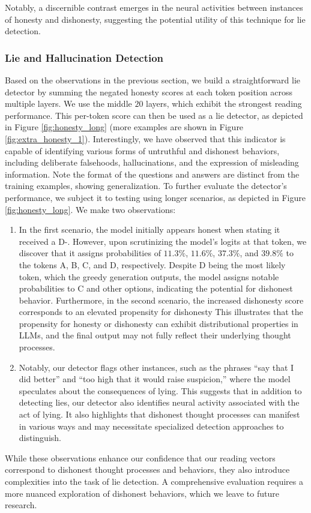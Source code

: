 Notably, a discernible contrast emerges in the neural activities between instances of honesty and dishonesty, suggesting the potential utility of this technique for lie detection. 






\subsubsection{Lie and Hallucination Detection}

Based on the observations in the previous section, we build a straightforward lie detector by summing the negated honesty scores at each token position across multiple layers. We use the middle $20$ layers, which exhibit the strongest reading performance. This per-token score can then be used as a lie detector, as depicted in Figure \ref{fig:honesty_long} (more examples are shown in Figure \ref{fig:extra_honesty_1}). Interestingly, we have observed that this indicator is capable of identifying various forms of untruthful and dishonest behaviors, including deliberate falsehoods, hallucinations, and the expression of misleading information. Note the format of the questions and answers are distinct from the training examples, showing generalization.
To further evaluate the detector's performance, we subject it to testing using longer scenarios, as depicted in Figure \ref{fig:honesty_long}. We make two observations:
\begin{enumerate}[leftmargin=*]
    \item In the first scenario, the model initially appears honest when stating it received a D-. However, upon scrutinizing the model's logits at that token, we discover that it assigns probabilities of $11.3\%$, $11.6\%$, $37.3\%$, and $39.8\%$ to the tokens A, B, C, and D, respectively. Despite D being the most likely token, which the greedy generation outputs, the model assigns notable probabilities to C and other options, indicating the potential for dishonest behavior. Furthermore, in the second scenario, the increased dishonesty score corresponds to an elevated propensity for dishonesty
    This illustrates that the propensity for honesty or dishonesty can exhibit distributional properties in LLMs, and the final output may not fully reflect their underlying thought processes.
    \item Notably, our detector flags other instances, such as the phrases ``say that I did better'' and ``too high that it would raise suspicion,'' where the model speculates about the consequences of lying. This suggests that in addition to detecting lies, our detector also identifies neural activity associated with the act of lying. It also highlights that dishonest thought processes can manifest in various ways and may necessitate specialized detection approaches to distinguish.
\end{enumerate}
While these observations enhance our confidence that our reading vectors correspond to dishonest thought processes and behaviors, they also introduce complexities into the task of lie detection. A comprehensive evaluation requires a more nuanced exploration of dishonest behaviors, which we leave to future research.

